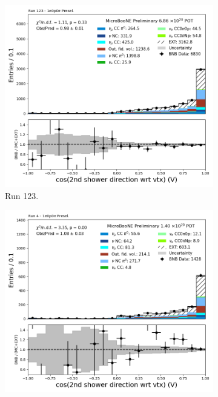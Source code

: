 \begin{figure}[H]
    \centering
    \begin{subfigure}[t]{0.32\linewidth}
        \includegraphics[width=\linewidth]{technote/Appendix_Preselection/Figures/1e0p0pi/Run123/secondshower_V_dot_Run123_1e0p0pi_Presel.png}
        \caption{Run 123.}
    \end{subfigure}%
    \hspace{0.2cm}%
    \begin{subfigure}[t]{0.32\linewidth}
        \includegraphics[width=\linewidth]{technote/Appendix_Preselection/Figures/1e0p0pi/Run4b/secondshower_V_dot_Run4b_1e0p0pi_Presel.png}

\end{subfigure}
\end{figure}
